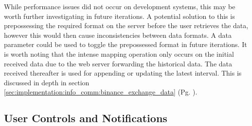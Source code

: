 While performance issues did not occur on development systems, this may be worth further investigating in future iterations. A potential solution to this is prepossessing the required format on the server before the user retrieves the data, however this would then cause inconsistencies between data formats. A data parameter could be used to toggle the prepossessed format in future iterations. It is worth noting that the intense mapping operation only occurs on the initial received data due to the web server forwarding the historical data. The data received thereafter is used for appending or updating the latest interval. This is discussed in depth in section \ref{sec:implementation:info_comm:binance_exchange_data} (Pg. \pageref{sec:implementation:info_comm:binance_exchange_data}).







\subsection{User Controls and Notifications}
\label{sec:implementation:frontend:controls_notifications}












